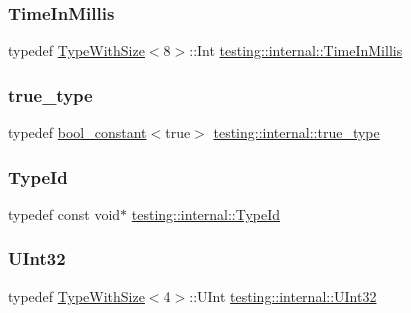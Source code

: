 \mbox{\label{namespacetesting_1_1internal_a66a845df404b38fe85c5e14a069f255a}} 
\subsubsection{\texorpdfstring{TimeInMillis}{TimeInMillis}}
{\footnotesize\ttfamily typedef \mbox{\hyperlink{classtesting_1_1internal_1_1TypeWithSize}{Type\+With\+Size}}$<$8$>$\+::Int \mbox{\hyperlink{namespacetesting_1_1internal_a66a845df404b38fe85c5e14a069f255a}{testing\+::internal\+::\+Time\+In\+Millis}}}

\mbox{\label{namespacetesting_1_1internal_a62f917c3424d8841de9b49b5ec28edb4}} 
\subsubsection{\texorpdfstring{true\_type}{true\_type}}
{\footnotesize\ttfamily typedef \mbox{\hyperlink{structtesting_1_1internal_1_1bool__constant}{bool\+\_\+constant}}$<$true$>$ \mbox{\hyperlink{namespacetesting_1_1internal_a62f917c3424d8841de9b49b5ec28edb4}{testing\+::internal\+::true\+\_\+type}}}

\mbox{\label{namespacetesting_1_1internal_ab1114197d3c657d8b7f8e0c5caa12d00}} 
\subsubsection{\texorpdfstring{TypeId}{TypeId}}
{\footnotesize\ttfamily typedef const void$\ast$ \mbox{\hyperlink{namespacetesting_1_1internal_ab1114197d3c657d8b7f8e0c5caa12d00}{testing\+::internal\+::\+Type\+Id}}}

\mbox{\label{namespacetesting_1_1internal_a40d4fffcd2bf56f18b1c380615aa85e3}} 
\subsubsection{\texorpdfstring{UInt32}{UInt32}}
{\footnotesize\ttfamily typedef \mbox{\hyperlink{classtesting_1_1internal_1_1TypeWithSize}{Type\+With\+Size}}$<$4$>$\+::U\+Int \mbox{\hyperlink{namespacetesting_1_1internal_a40d4fffcd2bf56f18b1c380615aa85e3}{testing\+::internal\+::\+U\+Int32}}}

